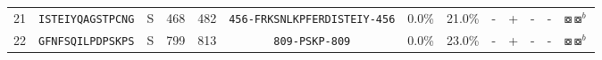 \begin{tabular}{rcccccccccccc}
21 &  \texttt{ISTEIYQAGSTPCNG} &       S &    468 &   482 &  \texttt{{\scriptsize 456-}FRKSNLKPFERDISTEIY{\scriptsize -456}} &                           0.0\% &                           21.0\% &          - &           + &          - &           - &                                                                           $ \boxcircle \boxcircle^b $ \\
22 &  \texttt{GFNFSQILPDPSKPS} &       S &    799 &   813 &                \texttt{{\scriptsize 809-}PSKP{\scriptsize -809}} &                           0.0\% &                           23.0\% &          - &           + &          - &           - &                                                                           $ \boxcircle \boxcircle^b $ \\
\bottomrule
\end{tabular}
